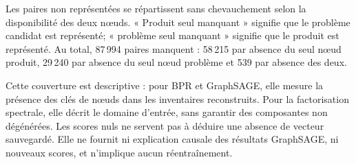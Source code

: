 Les paires non représentées se répartissent sans chevauchement selon la disponibilité des deux nœuds. « Produit seul manquant » signifie que le problème candidat est représenté; « problème seul manquant » signifie que le produit est représenté. Au total, 87\,994 paires manquent : 58\,215 par absence du seul nœud produit, 29\,240 par absence du seul nœud problème et 539 par absence des deux.

\begin{table}[!htbp]\centering\small
\caption{B2, paires candidates non représentées par trimestre, réparties selon les nœuds absents; source : .}
\label{tab:maude-B2-missing}

\end{table}

\FloatBarrier
Cette couverture est descriptive : pour BPR et GraphSAGE, elle mesure la présence des clés de nœuds dans les inventaires reconstruits. Pour la factorisation spectrale, elle décrit le domaine d'entrée, sans garantir des composantes non dégénérées. Les scores nuls ne servent pas à déduire une absence de vecteur sauvegardé. Elle ne fournit ni explication causale des résultats GraphSAGE, ni nouveaux scores, et n'implique aucun réentraînement.
